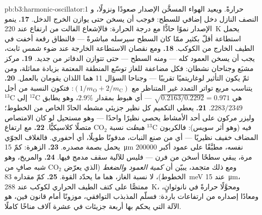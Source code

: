 \begin{solution}{pb:b3:harmonic-oscillator:1}
حرارةً. ويعيد الهواء المسخَّن الإصدار صعودًا ونزولًا، و
النصف النازل دخل إضافي للسطح: فوجب أن يسخن
حتى يوازن الخرج الدخل.
\textbf{17.} ينمو الإصدار نموًا حادًّا مع درجة الحرارة: فالإشعاع
الفالت من ارتفاع عند \qty{220}{K} يحمل استطاعة أقلّ بكثير ممّا
كان السطح سيرسله مباشرةً --- فالنطاق رقعة أخفت في
الطيف الخارج من الكوكب.
\textbf{18.} ومع نقصان الاستطاعة الخارجة عند ضوء شمس ثابت، يجب أن
يسخن العمود كله --- ومنه السطح --- حتى تتوازن الدفاتر
من جديد.
\textbf{19.} مركز مشبَع وجناحان نشطان: فكل مضاعفة للغاز
توسّع المنطقة المعتمة بزيادة مماثلة، ومن ثمّ يكون التأثير
لوغاريتميًا تقريبًا --- وجناحا السؤال 11 هما اللذان يقومان
بالعمل.
\textbf{20.} يتناسب مربع تواتر التمدد غير المتناظر مع $(1/m_{
\text{O}} + 2/m_{\text{C}})$: فتكون النسبة من أجل $^{13}$C إلى $^{12}$C
هي $\sqrt{0.2163/0.2292} = 0.971$ --- أي هبوط بمقدار $2.9\%$، وهو يطابق
$2283/2349$.
\textbf{21.} يعطي التكميم كل نظير جزيئي مشطه الحادّ
الخاص من الخطوط؛ وليزر مركون على أحد الأمشاط يحصي نظيرًا واحدًا
--- وهو مستحيل لو كان الامتصاص متصلًا كلاسيكيًّا.
\textbf{22.} مع ارتفاع CO$_2$ \emph{هبطت} نسبة $^{13}$C فيه
(وهو أثر سويس): فالكربون المضاف خفيف نظيريًا ---
أي من صنع النبات، مدفونًا طويلًا، أي أحفوري. فالغلاف الجوّي يحمل
بصمة مصدره.
\textbf{23.} الزهرة: كمّ \qty{15}{\micro m} نفسه، مطبَّقًا
على عمود أكبر $200000$ مرة، يبقي سطحًا أسخن من فرن
--- فليس للآلية سقف مدمج فيها.
\textbf{24.} والمريخ، وهو شبه صافٍ من CO$_2$ ومع ذلك متجمد، يبيّن أن
\emph{كمية العمود والضغط} (الذي يعرّض الخطوط)، لا نسبة
الغاز، هما ما يحدّد القوة.
\textbf{25.} كمّ مقداره \qty{83}{meV} عند \qty{15}{\micro m}،
ممتصًّا على كتف الطيف الحراري لكوكب عند \qty{288}{K}، ومحوَّلًا
حرارةً في نانوثوانٍ، ومعادًا إصداره من ارتفاعات باردة: فسلّم
المذبذب التوافقي، موزونًا أمام قانون فين، هو الآلة
التي يحكم بها أربعة جزيئات في عشرة آلاف مناخًا كاملًا.
\end{solution}
